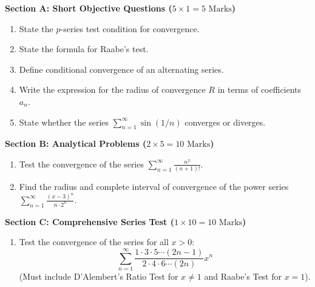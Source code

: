 \begin{chaptertest}
\noindent\textbf{Section A: Short Objective Questions ($5 \times 1 = 5\text{ Marks}$)}
\begin{enumerate}[leftmargin=1.5em]
    \item State the $p$-series test condition for convergence.
    \item State the formula for Raabe's test.
    \item Define conditional convergence of an alternating series.
    \item Write the expression for the radius of convergence $R$ in terms of coefficients $a_n$.
    \item State whether the series $\sum_{n=1}^\infty \sin(1/n)$ converges or diverges.
\end{enumerate}

\medskip
\noindent\textbf{Section B: Analytical Problems ($2 \times 5 = 10\text{ Marks}$)}
\begin{enumerate}[leftmargin=1.5em, start=6]
    \item Test the convergence of the series $\sum_{n=1}^\infty \frac{n^2}{(n+1)!}$.
    \item Find the radius and complete interval of convergence of the power series $\sum_{n=1}^\infty \frac{(x-3)^n}{n \cdot 2^n}$.
\end{enumerate}

\medskip
\noindent\textbf{Section C: Comprehensive Series Test ($1 \times 10 = 10\text{ Marks}$)}
\begin{enumerate}[leftmargin=1.5em, start=8]
    \item Test the convergence of the series for all $x > 0$:
    \begin{equation*}
        \sum_{n=1}^\infty \frac{1 \cdot 3 \cdot 5 \cdots (2n-1)}{2 \cdot 4 \cdot 6 \cdots (2n)} x^n
    \end{equation*}
    (Must include D'Alembert's Ratio Test for $x \ne 1$ and Raabe's Test for $x = 1$).
\end{enumerate}
\end{chaptertest}


